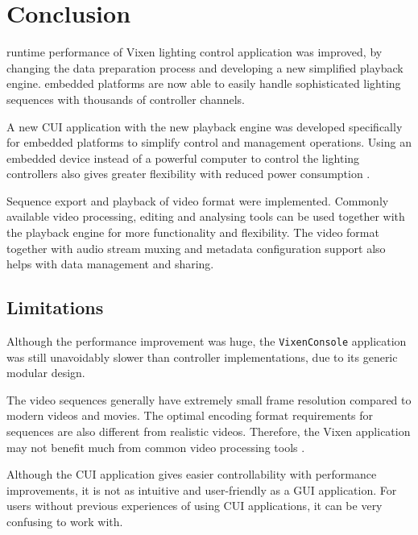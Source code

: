 \chapter{Conclusion}
\renewcommand{\baselinestretch}{\mystretch}
\label{chap:Conclusion}

 runtime performance of Vixen lighting control application was  improved, by changing the data preparation process and developing a new simplified playback engine.  embedded platforms are now able to easily handle sophisticated lighting sequences with thousands of controller channels.

A new CUI application with the new playback engine was developed specifically for embedded platforms to simplify control and management operations. Using an embedded device instead of a powerful computer to control the lighting controllers also gives greater flexibility with reduced power consumption .

Sequence export and playback of video format were implemented. Commonly available video processing, editing and analysing tools can be used together with the playback engine for more functionality and flexibility. The video format together with audio stream muxing and metadata configuration support also helps with data management and sharing.

\section{Limitations}

Although the performance improvement was huge, the \texttt{VixenConsole} application was still unavoidably slower than controller  implementations, due to its generic modular design.

The video sequences generally have extremely small frame resolution compared to modern videos and movies. The optimal encoding format requirements for sequences are also different from realistic videos. Therefore, the Vixen application may not benefit much from common video  processing tools .

Although the CUI application gives easier controllability with performance improvements, it is not as intuitive and user-friendly as a GUI application. For users without previous experiences of using CUI applications, it can be very confusing to work with.

